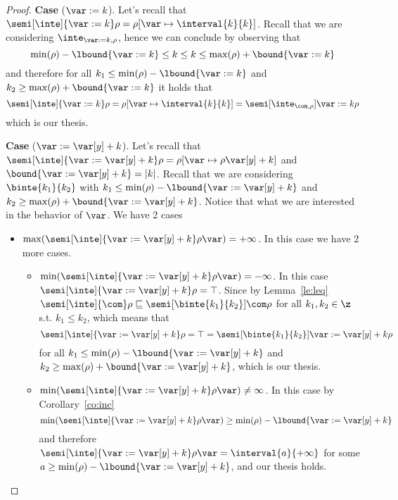 \begin{proof}
  \medskip
  
  \noindent
  \textbf{Case} (\(\var := k\)).
  Let's recall that
  \({\semi[\inte]{\var := k}\rho = \rho[\var \mapsto \interval{k}{k}
    ]}\). Recall that we are considering \(\inte_{\var := k,\rho}\),
  hence we can conclude by observing that
  \begin{equation*}
    \min(\rho) - \lbound{\var := k} \leq k \leq k \leq \max(\rho) + \bound{\var := k}
  \end{equation*}
  and therefore for all \(k_1 \leq \min(\rho) - \lbound{\var:=k}\) and
  \(k_2 \geq \max(\rho) + \bound{\var := k}\) it holds that
  \begin{equation*}
    \semi[\inte]{\var := k}\rho = \rho[\var \mapsto \interval{k}{k}] = \semi[\inte_{\com,\rho}]{\var := k}\rho
  \end{equation*}
  which is our thesis.

  \medskip
  
  \noindent
  \textbf{Case} (\(\var := \var[y] + k\)).
  Let's recall that
  \({\semi[\inte]{\var := \var[y] + k}\rho = \rho[\var \mapsto
    \rho\var[y] + k]}\) and \(\bound{\var := \var[y] + k} =
  |k|\). Recall that we are considering \(\binte{k_1}{k_2}\) with
  \(k_1 \leq \min(\rho) - \lbound{\var := \var[y] + k}\) and
  \(k_2 \geq \max(\rho) + \bound{\var := \var[y] + k}\). Notice that
  what we are interested in the behavior of \(\var\). We have 2 cases
  \begin{itemize}
  \item
    \({\max(\semi[\inte]{\var := \var[y] + k}\rho\var)} =
    +\infty\). In this case we have 2 more cases.
    \begin{itemize}
    \item
      \({\min(\semi[\inte]{\var := \var[y] + k}\rho\var)} =
      -\infty\). In this case
      \({\semi[\inte]{\var := \var[y] + k}\rho} = \top\). Since by
      Lemma~\ref{le:leq}
      \(\semi[\inte]{\com}\rho \sqsubseteq
      \semi[\binte{k_1}{k_2}]{\com}\rho\) for all \(k_1, k_2 \in \z\)
      s.t. \(k_1 \leq k_2\), which means that
      \begin{equation*}
        \semi[\inte]{\var := \var[y] + k}\rho = \top = \semi[\binte{k_1}{k_2}]{\var := \var[y] + k}\rho
      \end{equation*}
      for all \(k_1 \leq \min(\rho) - \lbound{\var := \var[y] + k}\)
      and \(k_2 \geq \max(\rho) + \bound{\var := \var[y] + k}\), which
      is our thesis.
    \item
      \({\min(\semi[\inte]{\var := \var[y] + k}\rho\var)} \neq
      \infty\). In this case by Corollary~\ref{co:inc}
      \begin{equation*}
        \min(\semi[\inte]{\var := \var[y] + k}\rho\var) \geq \min(\rho) - \lbound{\var := \var[y] + k}
      \end{equation*}
      and therefore
      \({\semi[\inte]{\var := \var[y] + k}\rho\var} =
      \interval{a}{+\infty}\) for some
      \(a \geq \min(\rho) - \lbound{\var := \var[y] + k}\), and our
      thesis holds.


\end{itemize}
\end{itemize}
\end{proof}
